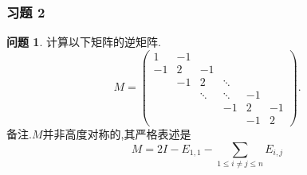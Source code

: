 \documentclass[11pt]{ctexart}
\theoremstyle{definition}
\newtheorem{qqq}{问题}[section]
\numberwithin{equation}{section}
\begin{document}
\subsubsection{习题 2}
\begin{qqq}
    计算以下矩阵的逆矩阵.
    \begin{equation}
        M=\begin{pmatrix}
            1&-1& & & & \\-1&2&-1& & & \\ & -1&2&\ddots& & \\ & &\ddots&\ddots&-1& \\ & & &-1&2&-1\\ & & & &-1&2
        \end{pmatrix}.
    \end{equation}
    备注.$M$并非高度对称的,其严格表述是
    \begin{equation} M=2I-E_{1,1}-\sum_{1\leq i\neq j\leq n}E_{i,j}\end{equation}
\end{qqq}
\begin{aaa}

\end{aaa}
\end{document}
